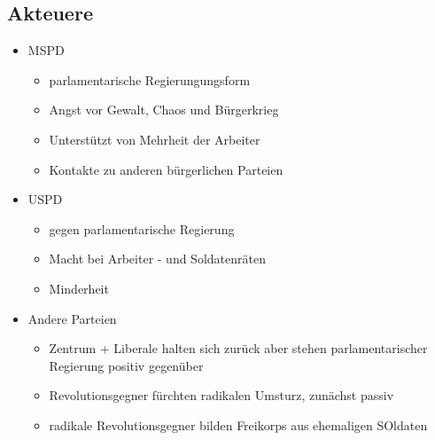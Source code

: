 \documentclass{article}
\begin{document}
\subsection*{Akteuere}
\begin{itemize}
    \item MSPD \begin{itemize}
        \item parlamentarische Regierungungsform
        \item Angst vor Gewalt, Chaos und Bürgerkrieg
        \item Unterstützt von Mehrheit der Arbeiter
        \item Kontakte zu anderen bürgerlichen Parteien
    \end{itemize}
    \item USPD \begin{itemize}
        \item gegen parlamentarische Regierung
        \item Macht bei Arbeiter - und Soldatenräten
        \item Minderheit
    \end{itemize}
    \item Andere Parteien \begin{itemize}
        \item Zentrum + Liberale halten sich zurück aber stehen parlamentarischer Regierung positiv gegenüber
        \item Revolutionsgegner fürchten radikalen Umsturz, zunächst passiv
        \item radikale Revolutionsgegner bilden Freikorps aus ehemaligen SOldaten
    \end{itemize}
\end{itemize}
\end{document}
